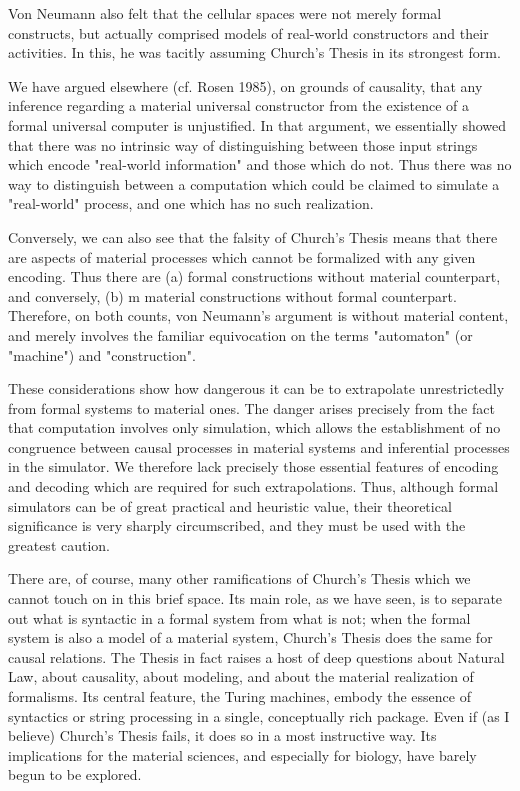 \documentclass[a4paper,12pt]{article}
\begin{document}
Von Neumann also felt that the cellular spaces were not merely formal constructs, but actually comprised models of real-world
constructors and their activities. In this, he was tacitly assuming Church's Thesis in its strongest form.

We have argued elsewhere (cf. Rosen 1985), on grounds of causality, that
any inference regarding a material universal constructor from the existence
of a formal universal computer is unjustified.  In that argument, we essentially
showed that there was no intrinsic way of distinguishing between
those input strings which encode "real-world information" and those which
do not. Thus there was no way to distinguish between a computation which
could be claimed to simulate a "real-world" process, and one which has no
such realization.

Conversely, we can also see that the falsity of Church's Thesis means that there are aspects of material processes which cannot be formalized with any given encoding.
Thus there are (a) formal constructions without material counterpart, and conversely, (b) m material constructions without formal counterpart.
Therefore, on both counts, von Neumann's argument is without material content, and merely involves the familiar equivocation on
the terms "automaton" (or "machine") and "construction".

These considerations show how dangerous it can be to extrapolate unrestrictedly from formal systems to material ones.
The danger arises precisely from the fact that computation involves only simulation, which allows the establishment of
no congruence between causal processes in material systems and inferential processes in the simulator. We therefore lack precisely
those essential features of encoding and decoding which are required for such extrapolations. Thus, although formal simulators can be of
great practical and heuristic value, their theoretical significance is very sharply circumscribed, and they must be used with the greatest caution.

There are, of course, many other ramifications of Church's Thesis which we cannot touch on in this brief space. Its main role, as we have seen,
is to separate out what is syntactic in a formal system from what is not; when the formal system is also a model of a material system,
Church's Thesis does the same for causal relations. The Thesis in fact raises a host of deep questions about Natural Law, about causality,
about modeling, and about the material realization of formalisms. Its central feature, the Turing machines, embody the essence of syntactics
or string processing in a single, conceptually rich package. Even if (as I believe) Church's Thesis fails, it does so in a most instructive way.
Its implications for the material sciences, and especially for biology, have barely begun to be explored.
\end{document}
